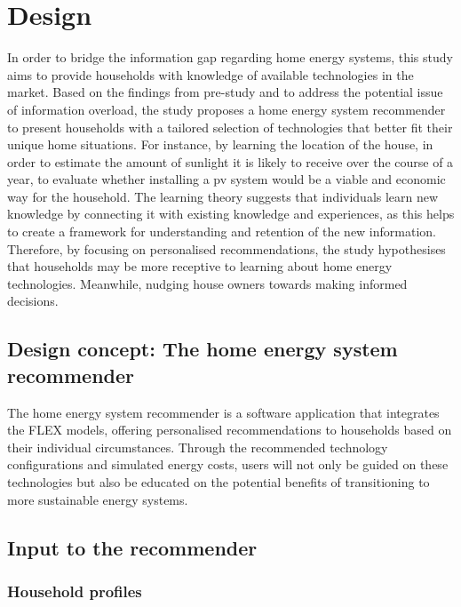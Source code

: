 \chapter{Design} 

In order to bridge the information gap regarding home energy systems, this study aims to provide households with knowledge of available technologies in the market. 
Based on the findings from pre-study and to address the potential issue of information overload, the study proposes a home energy system recommender to present households with a tailored selection of technologies that better fit their unique home situations. 
For instance, by learning the location of the house, in order to estimate the amount of sunlight it is likely to receive over the course of a year, to evaluate whether installing a \gls{pv} system would be a viable and economic way for the household.
The learning theory suggests that individuals learn new knowledge by connecting it with existing knowledge and experiences, as this helps to create a framework for understanding and retention of the new information.
Therefore, by focusing on personalised recommendations, the study hypothesises that households may be more receptive to learning about home energy technologies. 
Meanwhile, nudging house owners towards making informed decisions. 


\section{Design concept: The home energy system recommender}

The home energy system recommender is a software application that integrates the FLEX models,
offering personalised recommendations to households based on their individual circumstances.
Through the recommended technology configurations and simulated energy costs, 
users will not only be guided on these technologies but also be educated on the potential benefits of transitioning to more sustainable energy systems. 


\section{Input to the recommender}


\subsection{Household profiles}

